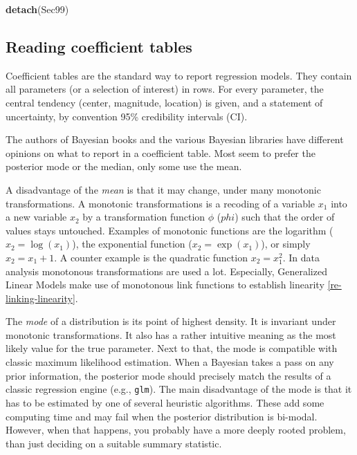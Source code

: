 \documentclass[]{svmono}
\newenvironment{Shaded}{\begin{snugshade}}{\end{snugshade}}
\newcommand{\KeywordTok}[1]{\textcolor[rgb]{0.13,0.29,0.53}{\textbf{#1}}}
\newcommand{\NormalTok}[1]{#1}
\theoremstyle{definition}
\theoremstyle{definition}
\theoremstyle{definition}
\theoremstyle{remark}
\begin{document}
\begin{Shaded}
\begin{Highlighting}[]
\KeywordTok{detach}\NormalTok{(Sec99)}
\end{Highlighting}
\end{Shaded}

\subsection{Reading coefficient
tables}\label{reading-coefficient-tables}

Coefficient tables are the standard way to report regression models.
They contain all parameters (or a selection of interest) in rows. For
every parameter, the central tendency (center, magnitude, location) is
given, and a statement of uncertainty, by convention 95\% credibility
intervals (CI).

The authors of Bayesian books and the various Bayesian libraries have
different opinions on what to report in a coefficient table. Most seem
to prefer the posterior mode or the median, only some use the mean.

A disadvantage of the \emph{mean} is that it may change, under many
monotonic transformations. A monotonic transformations is a recoding of
a variable \(x_1\) into a new variable \(x_2\) by a transformation
function \(\phi\) (\(phi\)) such that the order of values stays
untouched. Examples of monotonic functions are the logarithm
(\(x_2 = \log(x_1)\)), the exponential function (\(x_2 = \exp(x_1)\)),
or simply \(x_2 = x_1 + 1\). A counter example is the quadratic function
\(x_2 = x_1^2\). In data analysis monotonous transformations are used a
lot. Especially, Generalized Linear Models make use of monotonous link
functions to establish linearity \ref{re-linking-linearity}.

The \emph{mode} of a distribution is its point of highest density. It is
invariant under monotonic transformations. It also has a rather
intuitive meaning as the most likely value for the true parameter. Next
to that, the mode is compatible with classic maximum likelihood
estimation. When a Bayesian takes a pass on any prior information, the
posterior mode should precisely match the results of a classic
regression engine (e.g., \texttt{glm}). The main disadvantage of the
mode is that it has to be estimated by one of several heuristic
algorithms. These add some computing time and may fail when the
posterior distribution is bi-modal. However, when that happens, you
probably have a more deeply rooted problem, than just deciding on a
suitable summary statistic.
\end{document}
